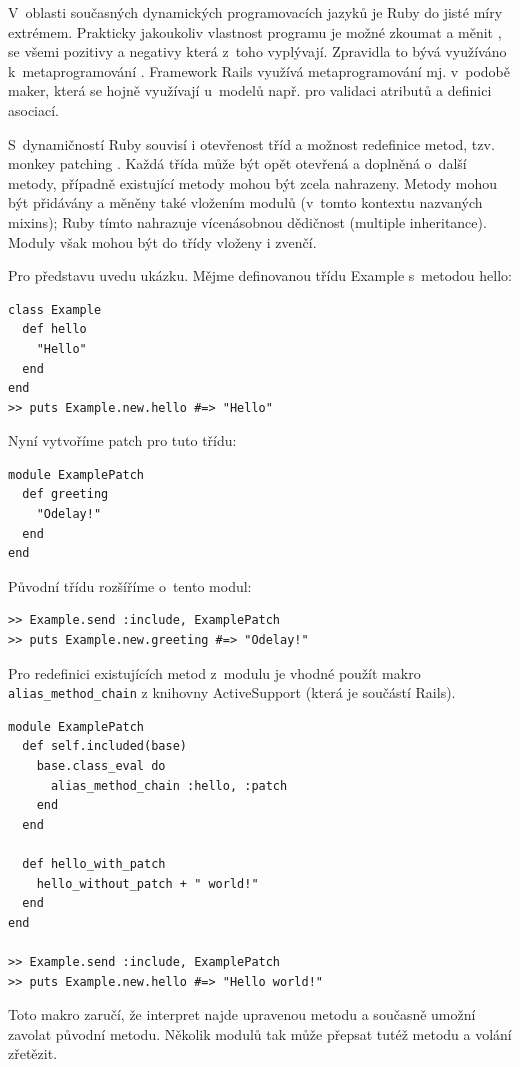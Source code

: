 \documentclass[thesis=B,czech]{FITthesis}[2012/05/02]
\begin{document}
V~oblasti současných dynamických programovacích jazyků je Ruby do jisté
míry extrémem. Prakticky jakoukoliv vlastnost programu je možné zkoumat
a měnit , se všemi pozitivy a negativy která z~toho vyplývají.
Zpravidla to bývá využíváno k~metaprogramování \citep[3c]{why2008}.
Framework Rails využívá metaprogramování mj. v~podobě maker, která se
hojně využívají u~modelů např. pro validaci atributů a definici
asociací.

S~dynamičností Ruby souvisí i otevřenost tříd a možnost redefinice
metod, tzv. monkey patching \citep[str. 293]{Olsen2011}. Každá třída
může být opět otevřená a doplněná o~další metody, případně existující
metody mohou být zcela nahrazeny. Metody mohou být přidávány a měněny
také vložením modulů (v~tomto kontextu nazvaných mixins); Ruby tímto
nahrazuje vícenásobnou dědičnost (multiple inheritance). Moduly však
mohou být do třídy vloženy i zvenčí.

Pro představu uvedu ukázku. Mějme definovanou třídu Example
s~metodou hello:

\begin{lstlisting}
class Example
  def hello
    "Hello"
  end
end
>> puts Example.new.hello #=> "Hello"
\end{lstlisting}
Nyní vytvoříme patch pro tuto třídu:

\begin{lstlisting}
module ExamplePatch
  def greeting
    "Odelay!"
  end
end
\end{lstlisting}
Původní třídu rozšíříme o~tento modul:

\begin{lstlisting}
>> Example.send :include, ExamplePatch
>> puts Example.new.greeting #=> "Odelay!"
\end{lstlisting}
Pro redefinici existujících metod z~modulu je vhodné použít makro \\
\lstinline!alias_method_chain! z knihovny
ActiveSupport (která je součástí Rails).

\begin{lstlisting}
module ExamplePatch
  def self.included(base)
    base.class_eval do
      alias_method_chain :hello, :patch
    end
  end

  def hello_with_patch
    hello_without_patch + " world!"
  end
end

>> Example.send :include, ExamplePatch
>> puts Example.new.hello #=> "Hello world!"
\end{lstlisting}
Toto makro zaručí, že interpret najde upravenou metodu a současně umožní
zavolat původní metodu. Několik modulů tak může přepsat tutéž metodu a
volání zřetězit.
\end{document}
